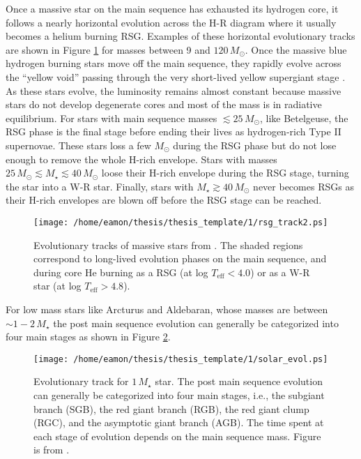 Once a massive star on the main sequence has exhausted its  hydrogen core, it follows a nearly horizontal evolution across the H-R diagram where it usually becomes a helium burning RSG. Examples of these horizontal evolutionary tracks are shown in Figure \ref{fig:1.5.2.1} for masses between 9 and $120\,M_{\odot}$. Once the massive blue hydrogen burning stars move off the main sequence, they rapidly evolve across the ``yellow void'' passing through the very short-lived yellow supergiant stage \citep{levesque_2010}. As these stars evolve, the luminosity remains almost constant because massive stars do not develop degenerate cores and most of the mass is in radiative equilibrium. For stars with main sequence masses $\lesssim 25\,M_{\odot}$, like Betelgeuse, the RSG phase is the final stage before ending their lives as hydrogen-rich Type II supernovae. These stars loss a few $M_{\odot}$ during the RSG phase but do not lose enough to remove the whole H-rich envelope. Stars with masses $25\,M_{\odot}\lesssim M_{\star} \lesssim 40\,M_{\odot}$ loose their H-rich envelope during the RSG stage, turning the star into a W-R star. Finally, stars with $M_{\star} \gtrsim 40\,M_{\odot}$ never becomes RSGs as their H-rich envelopes are blown off before the RSG stage can be reached.

\begin{figure}[hbt!]
\centering 
          \texttt{[image: /home/eamon/thesis/thesis\_template/1/rsg\_track2.ps]}
\caption[Evolutionary tracks of massive stars]{Evolutionary tracks of massive stars from \cite{maeder_1987}. The shaded regions correspond to long-lived evolution phases on the main sequence, and during core He burning as a RSG (at log $T_{\mathrm{eff}} < 4.0$) or as a W-R star (at log $T_{\mathrm{eff}} > 4.8$).}
\label{fig:1.5.2.1}
\end{figure}

For low mass stars like Arcturus and Aldebaran, whose masses are between $\sim 1-2\,M_{\star}$ the post main sequence evolution can generally be categorized into four main stages as shown in Figure \ref{fig:1.5.2.2}.

\begin{figure}[hbt!]
\centering 
    \texttt{[image: /home/eamon/thesis/thesis\_template/1/solar\_evol.ps]}
\caption[Evolution track of a low mass star]{Evolutionary track for $1\,M_{\star}$ star. The post main sequence evolution can generally be categorized into four main stages, i.e., the subgiant branch (SGB), the red giant branch (RGB), the red giant clump (RGC), and the asymptotic giant branch (AGB). The time spent at each stage of evolution depends on the main sequence mass. Figure is from \cite{ryan_2010}.}
\label{fig:1.5.2.2}
\end{figure}

